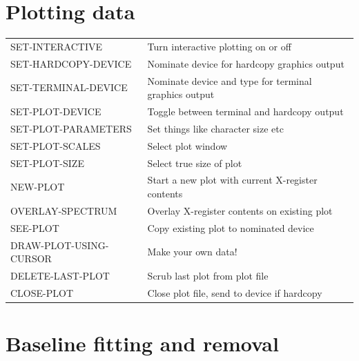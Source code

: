 \documentclass[11pt,twoside]{report}
\begin{document}
\section{Plotting data} 

\begin{tabular}{ll}
SET-INTERACTIVE        & Turn interactive plotting on or off\\
SET-HARDCOPY-DEVICE    & Nominate device for hardcopy graphics output\\
SET-TERMINAL-DEVICE    & Nominate device and type for terminal graphics output\\
SET-PLOT-DEVICE        & Toggle between terminal and hardcopy output\\
SET-PLOT-PARAMETERS    & Set things like character size etc\\
SET-PLOT-SCALES        & Select plot window\\
SET-PLOT-SIZE          & Select true size of plot\\
NEW-PLOT               & Start a new plot with current X-register contents\\
OVERLAY-SPECTRUM       & Overlay X-register contents on existing plot\\
SEE-PLOT               & Copy existing plot to nominated device\\
DRAW-PLOT-USING-CURSOR & Make your own data!\\
DELETE-LAST-PLOT       & Scrub last plot from plot file\\
CLOSE-PLOT             & Close plot file, send to device if hardcopy\\
\end{tabular}

\section{Baseline fitting and removal} 
\end{document}
